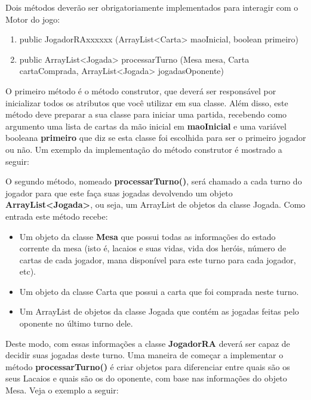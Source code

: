 \documentclass[10pt]{article}
\begin{document}
Dois métodos deverão ser obrigatoriamente implementados para interagir com o Motor do jogo:

\begin{enumerate}
    \item public JogadorRAxxxxxx (ArrayList<Carta> maoInicial, boolean primeiro){}
    \item public ArrayList<Jogada> processarTurno (Mesa mesa, Carta cartaComprada, ArrayList<Jogada> jogadasOponente){}
\end{enumerate}

O primeiro método é o método construtor, que deverá ser responsável por inicializar todos os atributos que você utilizar em sua classe. Além disso, este método deve preparar a sua classe para iniciar uma partida, recebendo como argumento uma lista de cartas da mão inicial em \textbf{maoInicial} e uma variável booleana \textbf{primeiro} que diz se esta classe foi escolhida para ser o primeiro jogador ou não. Um exemplo da implementação do método construtor é mostrado a seguir:



O segundo método, nomeado \textbf{processarTurno()}, será chamado a cada turno do jogador para que este faça suas jogadas devolvendo um objeto \textbf{ArrayList<Jogada>}, ou seja, um ArrayList de objetos da classe Jogada. Como entrada este método recebe:

\begin{itemize}
    \item Um objeto da classe \textbf{Mesa} que possui todas as informações do estado corrente da mesa (isto é, lacaios e suas vidas, vida dos heróis, número de cartas de cada jogador, mana disponível para este turno para cada jogador, etc).
    \item Um objeto da classe Carta que possui a carta que foi comprada neste turno.
    \item Um ArrayList de objetos da classe Jogada que contém as jogadas feitas pelo oponente no último turno dele.
\end{itemize} 

Deste modo, com essas informações a classe \textbf{JogadorRA} deverá ser capaz de decidir suas jogadas deste turno. Uma maneira de começar a implementar o método \textbf{processarTurno()} é criar objetos para diferenciar entre quais são os seus Lacaios e quais são os do oponente, com base nas informações do objeto Mesa. Veja o exemplo a seguir:

\end{document}
